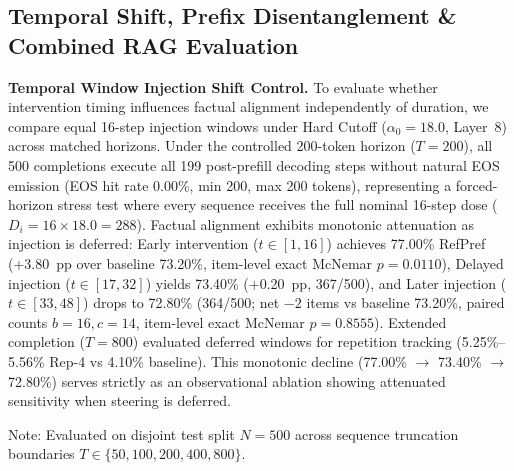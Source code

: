 \documentclass[runningheads]{llncs}
\begin{document}
\subsection{Temporal Shift, Prefix Disentanglement \& Combined RAG Evaluation}\label{sec:advanced_analysis}
\textbf{Temporal Window Injection Shift Control.} To evaluate whether intervention timing influences factual alignment independently of duration, we compare equal 16-step injection windows under Hard Cutoff ($\alpha_0=18.0$, Layer~8) across matched horizons. Under the controlled 200-token horizon ($T=200$), all 500 completions execute all 199 post-prefill decoding steps without natural EOS emission (EOS hit rate 0.00\%, min 200, max 200 tokens), representing a forced-horizon stress test where every sequence receives the full nominal 16-step dose ($D_i = 16 \times 18.0 = 288$). Factual alignment exhibits monotonic attenuation as injection is deferred: Early intervention ($t \in [1, 16]$) achieves 77.00\% RefPref (+3.80~pp over baseline 73.20\%, item-level exact McNemar $p=0.0110$), Delayed injection ($t \in [17, 32]$) yields 73.40\% (+0.20~pp, 367/500), and Later injection ($t \in [33, 48]$) drops to 72.80\% (364/500; net $-2$ items vs baseline 73.20\%, paired counts $b=16, c=14$, item-level exact McNemar $p=0.8555$). Extended completion ($T=800$) evaluated deferred windows for repetition tracking (5.25\%--5.56\% Rep-4 vs 4.10\% baseline). This monotonic decline (77.00\% $\rightarrow$ 73.40\% $\rightarrow$ 72.80\%) serves strictly as an observational ablation showing attenuated sensitivity when steering is deferred.

\begin{table}[!t]
\centering
\caption{Truncated prefix RefPref accuracy (\%) across sequence length boundaries ($N_{\text{test}}=500$).}
\label{tab:prefix_disentanglement}
\small
{}
\smallskip\noindent\scriptsize Note: Evaluated on disjoint test split $N=500$ across sequence truncation boundaries $T \in \{50, 100, 200, 400, 800\}$.
\end{table}
\end{document}

